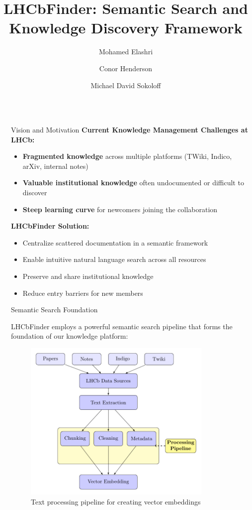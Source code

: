 \documentclass[final]{beamer}
\title{LHCbFinder: Semantic Search and Knowledge Discovery Framework}
\author{Mohamed Elashri \and Conor Henderson \and Michael David Sokoloff}
\institute[shortinst]{University of Cincinnati \& LHCb Collaboration}
\newlength{\sepwidth}
\newlength{\colwidth}
\newcommand{\separatorcolumn}{\begin{column}{\sepwidth}\end{column}}
\begin{document}
\begin{frame}[t]
\begin{columns}[t]
\separatorcolumn

\begin{column}{\colwidth}

  \begin{block}{Vision and Motivation}
    \textbf{Current Knowledge Management Challenges at LHCb:}
    \begin{itemize}
      \item \textbf{Fragmented knowledge} across multiple platforms (TWiki, Indico, arXiv, internal notes)
      \item \textbf{Valuable institutional knowledge} often undocumented or difficult to discover
      \item \textbf{Steep learning curve} for newcomers joining the collaboration
    \end{itemize}

    \textbf{LHCbFinder Solution:}
    \begin{itemize}
      \item Centralize scattered documentation in a semantic framework
      \item Enable intuitive natural language search across all resources
      \item Preserve and share institutional knowledge
      \item Reduce entry barriers for new members
    \end{itemize}
  \end{block}

  \begin{block}{Semantic Search Foundation}
    
    LHCbFinder employs a powerful semantic search pipeline that forms the foundation of our knowledge platform:
    
    \begin{figure}
      \centering
      \includegraphics[width=0.85\textwidth]{figure1-text-processing.pdf}
      \caption{Text processing pipeline for creating vector embeddings}
    \end{figure}


\end{block}
\end{column}
\end{columns}
\end{frame}
\end{document}
